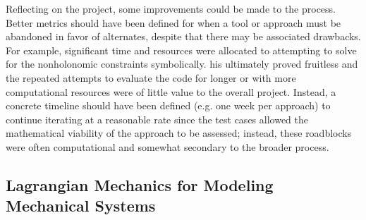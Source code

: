 Reflecting on the project, some improvements could be made to the process. 
Better metrics should have been defined for when a tool or approach must be abandoned in favor of alternates, despite that there may be associated drawbacks. 
For example, significant time and resources were allocated to attempting to solve for the nonholonomic constraints symbolically. 
his ultimately proved fruitless and the repeated attempts to evaluate the code for longer or with more computational resources were of little value to the overall project. 
Instead, a concrete timeline should have been defined (e.g. one week per approach) to continue iterating at a reasonable rate since the test cases allowed the mathematical viability of the approach to be assessed; instead, these roadblocks were often computational and somewhat secondary to the broader process.
\subsection{Lagrangian Mechanics for Modeling Mechanical Systems}

